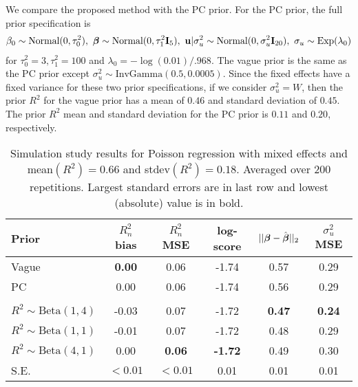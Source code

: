 \documentclass[12pt]{article}
\begin{document}
We compare the proposed method with the PC prior. For the PC prior, the full prior specification is
\begin{multline}
       \beta_0\sim\mbox{Normal}(0,\tau_0^2),\        \bbeta\sim\mbox{Normal}(0, \tau_1^2\bI_{5}),\
       {\bf u}|\sigma^2_u\sim\mbox{Normal}(0,\sigma^2_u\bI_{20}),\ \sigma_u \sim\mbox{Exp}(\lambda_0)
\end{multline}
for $\tau_0^2=3,\tau_1^2=100$ and $\lambda_0=-\log(0.01)/.968$. The vague prior is the same as the PC prior except $\sigma^2_u\sim\mbox{InvGamma}(0.5, 0.0005)$. Since the fixed effects have a fixed variance for these two prior specifications, if we consider $\sigma^2_u=W$, then the prior $R^2$ for the vague prior has a mean of $0.46$ and standard deviation of $0.45$. The prior $R^2$ mean and standard deviation for the PC prior is $0.11$ and $0.20$, respectively.



\begin{table}
\centering
    \begin{tabular}{l|ccccc}
        Prior & $R^2_n$ bias & $R^2_n$ MSE & log-score & $||\mbox{\boldmath $\beta$}-\hat{\mbox{\boldmath $\beta$}}||_2$ & $\sigma^2_u$ MSE \\\hline
        Vague & {\bf 0.00} &0.06 &-1.74 &0.57 &0.29 \\
        PC&0.00 &0.06 &-1.74 &0.56 &0.29 \\
        &\vspace{-10pt}\\
        $R^2\sim\mbox{Beta}(1,4)$ &-0.03 &0.07 &-1.72 &{\bf 0.47} &{\bf 0.24}\\
        $R^2\sim\mbox{Beta}(1,1)$  &-0.01 &0.07 &-1.72 &0.48 &0.29 \\
        $R^2\sim\mbox{Beta}(4,1)$ &0.00 &{\bf 0.06} &{\bf -1.72} &0.49 &0.30 \\\hline
        S.E. & $<0.01$ & $<0.01$ & 0.01 & 0.01 & 0.01
    \end{tabular}
    \caption{Simulation study results for Poisson regression with mixed effects and mean$(R^2)=0.66$ and stdev$(R^2)=0.18$. Averaged over 200 repetitions.  Largest standard errors are in last row and lowest (absolute) value is in bold.}
    \label{tab:PoissSim3}
\end{table}
\end{document}
